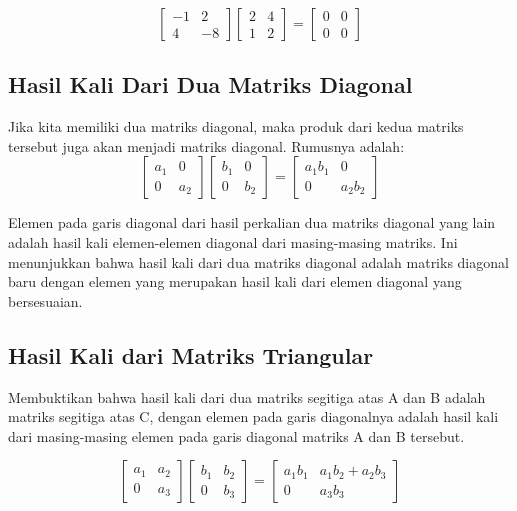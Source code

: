\documentclass{article}
\begin{document}
\[
    \begin{bmatrix}
        -1 & 2 \\ 4 & -8
    \end{bmatrix}
    \begin{bmatrix}
        2 & 4 \\ 1 & 2
    \end{bmatrix} =
    \begin{bmatrix}
        0 & 0 \\ 0 & 0
    \end{bmatrix}
\]

\subsection{Hasil Kali Dari Dua Matriks Diagonal}
Jika kita memiliki dua matriks diagonal, maka produk dari kedua matriks tersebut juga akan menjadi matriks diagonal. Rumusnya adalah:
\[
    \begin{bmatrix}
        a_1 & 0   \\
        0   & a_2
    \end{bmatrix}
    \begin{bmatrix}
        b_1 & 0   \\
        0   & b_2
    \end{bmatrix}
    =
    \begin{bmatrix}
        a_1b_1 & 0      \\
        0      & a_2b_2
    \end{bmatrix}
\]

Elemen pada garis diagonal dari hasil perkalian dua matriks diagonal yang lain adalah hasil kali elemen-elemen diagonal dari masing-masing matriks. Ini menunjukkan bahwa hasil kali dari dua matriks diagonal adalah matriks diagonal baru dengan elemen yang merupakan hasil kali dari elemen diagonal yang bersesuaian.

\subsection{Hasil Kali dari Matriks Triangular}
Membuktikan bahwa hasil kali dari dua matriks segitiga atas A dan B adalah matriks segitiga atas C, dengan elemen pada garis diagonalnya adalah hasil kali dari masing-masing elemen pada garis diagonal matriks A dan B tersebut.

\[
    \begin{bmatrix}
        a_1 & a_2 \\
        0   & a_3
    \end{bmatrix}
    \begin{bmatrix}
        b_1 & b_2 \\
        0   & b_3
    \end{bmatrix}
    =
    \begin{bmatrix}
        a_1b_1 & a_1b_2 + a_2b_3 \\
        0      & a_3b_3
    \end{bmatrix}
\]
\end{document}
